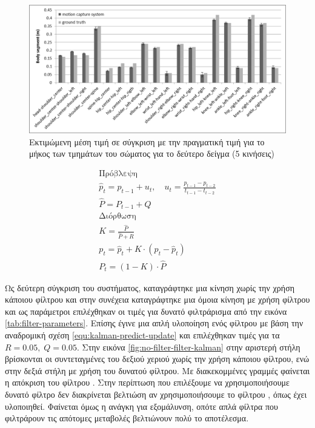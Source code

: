 \begin{figure}[H]
    \centering
    \includegraphics[width=.8\textwidth]{fig/subject02-segments.png}
    \caption{Εκτιμώμενη μέση τιμή σε σύγκριση με την πραγματική τιμή για το μήκος των τμημάτων του σώματος για το δεύτερο δείγμα (5 κινήσεις)}
    \label{fig:subject02-segments}
\end{figure}

\begin{equation}
    \begin{gathered}
        \text{Πρόβλεψη} \\
        \hat{p}_{t} = p_{t-1} + u_{t}, \quad u_{t} = \frac{p_{t-1} - p_{t-2}}{t_{t-1} - t_{t-2}} \\
        \hat{P} = P_{t-1} + Q \\[.5cm]
        \text{Διόρθωση} \\
        Κ = \frac{\hat{P}}{\hat{P} + R}\\
        p_{t} = \hat{p}_{t} + K \cdot (p_{t} - \hat{p}_{t}) \\
        P_{t} = (1 - K) \cdot \hat{P}
    \end{gathered}
    \label{equ:kalman-predict-update}
\end{equation}

Ως δεύτερη σύγκριση του συστήματος, καταγράφτηκε μια κίνηση χωρίς την χρήση κάποιου φίλτρου και στην συνέχεια καταγράφτηκε μια όμοια κίνηση με χρήση φίλτρου και ως παράμετροι επιλέχθηκαν οι τιμές για δυνατό φιλτράρισμα από την εικόνα \ref{tab:filter-parameters}. Επίσης έγινε μια απλή υλοποίηση ενός φίλτρου  με βάση την αναδρομική σχέση \ref{equ:kalman-predict-update} και επιλέχθηκαν τιμές για τα $R = 0.05,\; Q = 0.05$. Στην εικόνα \ref{fig:no-filter-filter-kalman} στην αριστερή στήλη βρίσκονται οι συντεταγμένες του δεξιού χεριού χωρίς την χρήση κάποιου φίλτρου, ενώ στην δεξιά στήλη με χρήση του δυνατού φίλτρου. Με διακεκομμένες γραμμές φαίνεται η απόκριση του φίλτρου . Στην περίπτωση που επιλέξουμε να χρησιμοποιήσουμε δυνατό φίλτρο δεν διακρίνεται βελτιώση αν χρησιμοποιήσουμε το φίλτρου , όπως έχει υλοποιηθεί. Φαίνεται όμως η ανάγκη για εξομάλυνση, οπότε απλά φίλτρα που φιλτράρουν τις απότομες μεταβολές βελτιώνουν πολύ το αποτέλεσμα.

